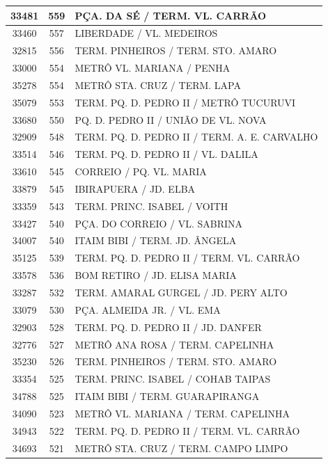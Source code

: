 \documentclass[
	12pt,				%
	oneside,			%
	a4paper,			%
	english,			%
	brazil				%
	]{abntex2ppgsi}
\begin{document}
{{\begin{apendicesenv}
\begin{longtable}{c|c|p{7cm}}
 \hline 
33481 &	559 &	PÇA. DA SÉ / TERM. VL. CARRÃO \\ 
 \hline 
33460 &	557 &	LIBERDADE / VL. MEDEIROS \\ 
 \hline 
32815 &	556 &	TERM. PINHEIROS / TERM. STO. AMARO \\ 
 \hline 
33000 &	554 &	METRÔ VL. MARIANA / PENHA \\ 
 \hline 
35278 &	554 &	METRÔ STA. CRUZ / TERM. LAPA \\ 
 \hline 
35079 &	553 &	TERM. PQ. D. PEDRO II / METRÔ TUCURUVI \\ 
 \hline 
33680 &	550 &	PQ. D. PEDRO II / UNIÃO DE VL. NOVA \\ 
 \hline 
32909 &	548 &	TERM. PQ. D. PEDRO II / TERM. A. E. CARVALHO \\ 
 \hline 
33514 &	546 &	TERM. PQ. D. PEDRO II / VL. DALILA \\ 
 \hline 
33610 &	545 &	CORREIO / PQ. VL. MARIA \\ 
 \hline 
33879 &	545 &	IBIRAPUERA / JD. ELBA \\ 
 \hline 
33359 &	543 &	TERM. PRINC. ISABEL / VOITH \\ 
 \hline 
33427 &	540 &	PÇA. DO CORREIO / VL. SABRINA \\ 
 \hline 
34007 &	540 &	ITAIM BIBI / TERM. JD. ÂNGELA \\ 
 \hline 
35125 &	539 &	TERM. PQ. D. PEDRO II / TERM. VL. CARRÃO \\ 
 \hline 
33578 &	536 &	BOM RETIRO / JD. ELISA MARIA \\ 
 \hline 
33287 &	532 &	TERM. AMARAL GURGEL / JD. PERY ALTO \\ 
 \hline 
33079 &	530 &	PÇA. ALMEIDA JR. / VL. EMA \\ 
 \hline 
32903 &	528 &	TERM. PQ. D. PEDRO II / JD. DANFER \\ 
 \hline 
32776 &	527 &	METRÔ ANA ROSA / TERM. CAPELINHA \\ 
 \hline 
35230 &	526 &	TERM. PINHEIROS / TERM. STO. AMARO \\ 
 \hline 
33354 &	525 &	TERM. PRINC. ISABEL / COHAB TAIPAS \\ 
 \hline 
34788 &	525 &	ITAIM BIBI / TERM. GUARAPIRANGA \\ 
 \hline 
34090 &	523 &	METRÔ VL. MARIANA / TERM. CAPELINHA \\ 
 \hline 
34943 &	522 &	TERM. PQ. D. PEDRO II / TERM. VL. CARRÃO \\ 
 \hline 
34693 &	521 &	METRÔ STA. CRUZ / TERM. CAMPO LIMPO \\ 
 \hline 

\end{longtable}
\end{apendicesenv}}}
\end{document}
